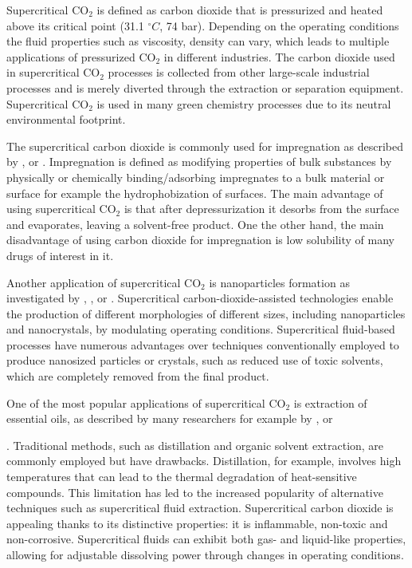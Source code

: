 \documentclass[a4paper,fleqn]{cas-dc}
\begin{document}
{Supercritical CO$_2$ is defined as carbon dioxide that is pressurized and heated above its critical point (31.1 $^\circ C$, 74 bar). Depending on the operating conditions the fluid properties such as viscosity, density can vary, which leads to multiple applications of pressurized CO$_2$ in different industries. The carbon dioxide used in supercritical CO$_2$ processes is collected from other large-scale industrial processes and is merely diverted through the extraction or separation equipment. Supercritical CO$_2$ is used in many green chemistry processes due to its neutral environmental footprint.
	
The supercritical carbon dioxide is commonly used for impregnation as described by \citet{Weidner2018}, \citet{Machado2022} or \citet{Fathi2022}. Impregnation is defined as modifying properties of bulk substances by physically or chemically binding/adsorbing impregnates to a bulk material or surface for example the hydrophobization of surfaces. The main advantage of using supercritical CO$_2$ is that after depressurization it desorbs from the surface and evaporates, leaving a solvent-free product. One the other hand, the main disadvantage of using carbon dioxide for impregnation is low solubility of many drugs of interest in it.

Another application of supercritical CO$_2$ is nanoparticles formation as investigated by \citet{Padrela2018}, \citet{Franco2021}, \citet{SaadatiArdestani2020} or \citet{Sodeifian2022}. Supercritical carbon-dioxide-assisted technologies enable the production of different morphologies of different sizes, including nanoparticles and nanocrystals, by modulating operating conditions. Supercritical fluid-based processes have numerous advantages over techniques conventionally employed to produce nanosized particles or crystals, such as reduced use of toxic solvents, which are completely removed from the final product.
	
One of the most popular applications of supercritical CO$_2$ is extraction of essential oils, as described by many researchers for example by \citet{Sodeifian2017}, \citet{Reverchon1993} or \citet{Sovova1994}}. Traditional methods, such as distillation and organic solvent extraction, are commonly employed but have drawbacks. Distillation, for example, involves high temperatures that can lead to the thermal degradation of heat-sensitive compounds. This limitation has led to the increased popularity of alternative techniques such as supercritical fluid extraction. Supercritical carbon dioxide is appealing thanks to its distinctive properties: it is inflammable, non-toxic and non-corrosive. Supercritical fluids can exhibit both gas- and liquid-like properties, allowing for adjustable dissolving power through changes in operating conditions.
\end{document}
